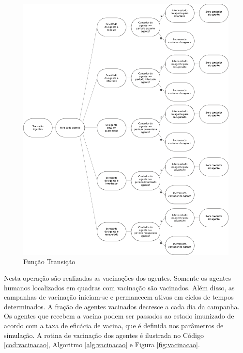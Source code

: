 \begin{figure}[H]
  \centering
  \includegraphics[width=1\textwidth]{Figuras/EstruturasDadosEstrategias/Operadores/Transicao.eps}
  \caption{Função Transição}
  \label{fig:transicao}
\end{figure} 


Nesta operação são realizadas as vacinações dos agentes. Somente os agentes humanos localizados em quadras com vacinação são vacinados. Além disso, as campanhas de vacinação iniciam-se e permanecem ativas em ciclos de tempos determinados. A fração de agentes vacinados decresce a cada dia da campanha. Os agentes que recebem a vacina podem ser passados ao estado imunizado de acordo com a taxa de eficácia de vacina, que é definida nos parâmetros de simulação. A rotina de vacinação dos agentes é ilustrada no Código \ref{cod:vacinacao}, Algoritmo \ref{alg:vacinacao} e Figura \ref{fig:vacinacao}. 



